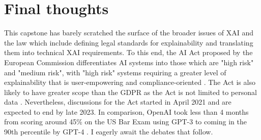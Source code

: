 \section{Final thoughts}
This capstone has barely scratched the surface of the broader issues of XAI and the law which include defining legal standards for explainability and translating them into technical XAI requirements. To this end, the AI Act proposed by the European Commission differentiates AI systems into those which are "high risk" and "medium risk", with "high risk" systems requiring a greater level of explainability that is user-empowering and compliance-oriented \cite{sovrano2022metrics}. The Act is also likely to have greater scope than the GDPR as the Act is not limited to personal data \cite{lilian_ai_act}. Nevertheless, discussions for the Act started in April 2021 and are expected to end by late 2023. In comparison, OpenAI took less than 4 months from scoring around 45\% on the US Bar Exam using GPT-3 to coming in the 90th percentile by GPT-4 \cite{katz2023gpt}. I eagerly await the debates that follow.